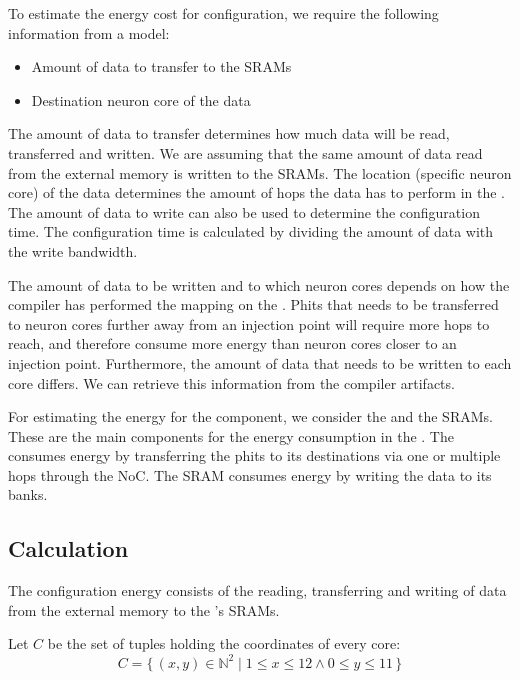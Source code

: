 To estimate the energy cost for configuration, we require the following information from a model:
\begin{itemize}
    \item Amount of data to transfer to the SRAMs
    \item Destination neuron core of the data
\end{itemize}

The amount of data to transfer determines how much data will be read, transferred and written.
We are assuming that the same amount of data read from the external memory is written to the SRAMs.
The location (specific neuron core) of the data determines the amount of hops the data has to perform in the \confignoc{}.
The amount of data to write can also be used to determine the configuration time.
The configuration time is calculated by dividing the amount of data with the write bandwidth.

The amount of data to be written and to which neuron cores depends on how the compiler has performed the mapping on the \graicore{}. %
Phits that needs to be transferred to neuron cores further away from an injection point will require more hops to reach, and therefore consume more energy than neuron cores closer to an injection point.
Furthermore, the amount of data that needs to be written to each core differs.
We can retrieve this information from the compiler artifacts.

For estimating the energy for the \graicore{} component, we consider the \confignoc{} and the SRAMs.
These are the main components for the energy consumption in the \graicore{}.
The \confignoc{} consumes energy by transferring the phits to its destinations via one or multiple hops through the NoC.
The SRAM consumes energy by writing the data to its banks.

\subsection{Calculation}
The configuration energy consists of the reading, transferring and writing of data from the external memory to the \graicore{}'s SRAMs. 

Let $C$ be the set of tuples holding the coordinates of every core:
\begin{equation*}
    C = \{\,\left(x,y\right) \in \mathbb{N}^2 \mid 1 \leq x \leq 12 \wedge 0 \leq y \leq 11 \,\} 
\end{equation*}

